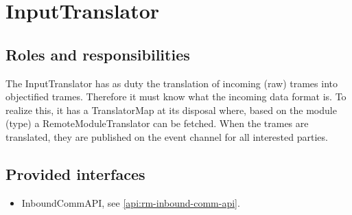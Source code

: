 	\section{InputTranslator}
\label{element:rm-input-translator}

\subsection{Roles and responsibilities}

\npar The InputTranslator has as duty the translation of incoming (raw) trames
into objectified trames. Therefore it must know what the incoming data format
is. To realize this, it has a TranslatorMap at its disposal where, based on
the module (type) a RemoteModuleTranslator can be fetched. When the trames are
translated, they are published on the event channel for all interested parties.

\subsection{Provided interfaces}

\begin{itemize}
  \item InboundCommAPI, see \ref{api:rm-inbound-comm-api}.
\end{itemize}